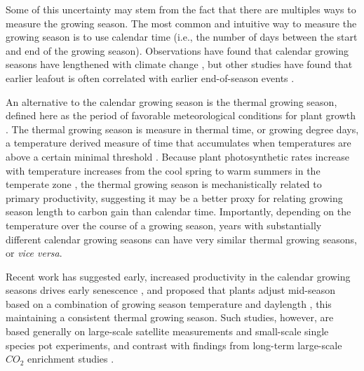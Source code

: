 \documentclass{article}[12pt]
\begin{document}
Some of this uncertainty may stem from the fact that there are multiples ways to measure the growing season. The most common and intuitive way to measure the growing season is to use calendar time (i.e., the number of days between the start and end of the growing season). Observations have found that calendar growing seasons have lengthened with climate change \citep{Menzel1999,Liu2010}, but other studies have found that earlier leafout is often correlated with earlier end-of-season events \citep{Zani2020,Liu2016,Keenan2015}. 

An alternative to the calendar growing season is the thermal growing season, defined here as the period of favorable meteorological conditions for plant growth \citep{Korner2023}. The thermal growing season is measure in thermal time, or growing degree days, a temperature derived measure of time that accumulates when temperatures are above a certain minimal threshold \citep{CHUINE2000337,Moore:2014wl,YANG199561}.  Because plant photosynthetic rates increase with temperature increases \citep{Farquhar:1980vm} from the cool spring to warm summers in the temperate zone , the thermal growing season is mechanistically related to primary productivity, suggesting it may be a better proxy for relating growing season length to carbon gain than calendar time. Importantly, depending on the temperature over the course of a growing season, years with substantially different calendar growing seasons can have very similar thermal growing seasons, or \emph{vice versa}.

Recent work has suggested early, increased productivity in the calendar growing seasons drives early senescence \citep{Zani2020}, and proposed that plants adjust mid-season based on a combination of growing season temperature and daylength \citep{Zohner2023}, this maintaining a consistent thermal growing season. Such studies, however, are based generally on large-scale satellite measurements and small-scale single species pot experiments, and contrast with findings from long-term large-scale $CO_2$ enrichment studies \citep{norby2021comment}.
\end{document}
